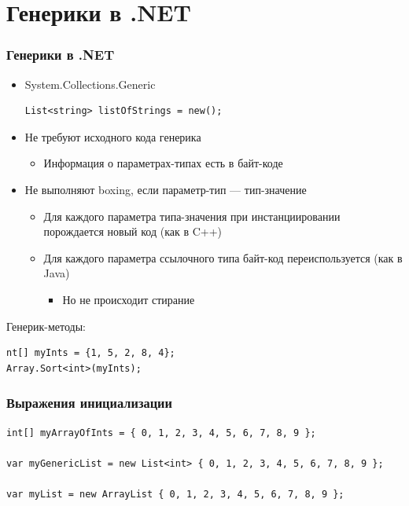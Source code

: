 \documentclass{../../slides-style}
\begin{document}
    \section{Генерики в .NET}

    \begin{frame}[fragile]
        \frametitle{Генерики в .NET}
        \begin{itemize}
            \item System.Collections.Generic
            \begin{verbatim}
List<string> listOfStrings = new();
            \end{verbatim}
            \item Не требуют исходного кода генерика
            \begin{itemize}
                \item Информация о параметрах-типах есть в байт-коде
            \end{itemize}
            \item Не выполняют boxing, если параметр-тип --- тип-значение
            \begin{itemize}
                \item Для каждого параметра типа-значения при инстанциировании порождается новый код (как в C++)
                \item Для каждого параметра ссылочного типа байт-код переиспользуется (как в Java)
                \begin{itemize}
                    \item Но не происходит стирание
                \end{itemize}
            \end{itemize}
        \end{itemize}

        Генерик-методы:
        \begin{verbatim}
nt[] myInts = {1, 5, 2, 8, 4};
Array.Sort<int>(myInts);
        \end{verbatim}
    \end{frame}

    \begin{frame}[fragile]
        \frametitle{Выражения инициализации}
        \begin{verbatim}
int[] myArrayOfInts = { 0, 1, 2, 3, 4, 5, 6, 7, 8, 9 };

var myGenericList = new List<int> { 0, 1, 2, 3, 4, 5, 6, 7, 8, 9 };

var myList = new ArrayList { 0, 1, 2, 3, 4, 5, 6, 7, 8, 9 };
        \end{verbatim}
    \end{frame}
\end{document}
